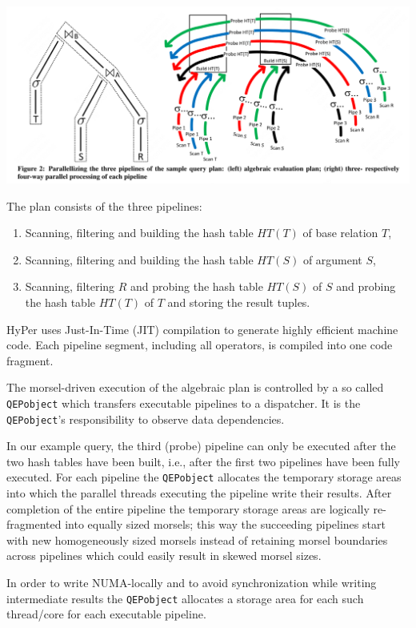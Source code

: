 \documentclass[11pt]{article}
\begin{document}
\begin{center}
\includegraphics[width=.8\textwidth]{../../images/papers/64.png}
\label{}
\end{center}

The plan consists of the three pipelines:
\begin{enumerate}
\item Scanning, filtering and building the hash table \(HT(T)\) of base relation \(T\),
\item Scanning, filtering and building the hash table \(HT(S)\) of argument \(S\),
\item Scanning, filtering \(R\) and probing the hash table \(HT(S)\) of \(S\) and probing the hash table
\(HT(T)\) of \(T\) and storing the result tuples.
\end{enumerate}

HyPer uses Just-In-Time (JIT) compilation to generate highly efficient machine code. Each pipeline
segment, including all operators, is compiled into one code fragment.

The morsel-driven execution of the algebraic plan is controlled by a so called \texttt{QEPobject} which
transfers executable pipelines to a dispatcher. It is the \texttt{QEPobject}'s responsibility
to observe data dependencies.

In our example query, the third (probe) pipeline can only be executed after the two hash tables have
been built, i.e., after the first two pipelines have been fully executed. For each pipeline the
\texttt{QEPobject} allocates the temporary storage areas into which the parallel threads executing the pipeline
write their results. After completion of the entire pipeline the temporary storage areas are logically
re-fragmented into equally sized morsels; this way the succeeding pipelines start with new
homogeneously sized morsels instead of retaining morsel boundaries across pipelines which could easily
result in skewed morsel sizes.

In order to write NUMA-locally and to avoid synchronization while writing intermediate results the
\texttt{QEPobject} allocates a storage area for each such thread/core for each executable pipeline.
\end{document}
